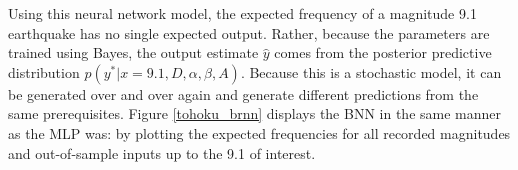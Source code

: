 Using this neural network model, the expected frequency of a magnitude
9.1 earthquake has no single expected output.  Rather, because the parameters are trained using Bayes, the output estimate $\hat{y}$ comes from the posterior predictive distribution $p(y^*|x=9.1,D,\alpha,\beta,A)$.  Because this is a stochastic model, it can be generated over and over again and generate different predictions from the same prerequisites.  Figure \ref{tohoku_brnn} displays the BNN in the same manner as the MLP was: by plotting the expected frequencies for all recorded magnitudes and out-of-sample inputs up to the 9.1 of interest.

